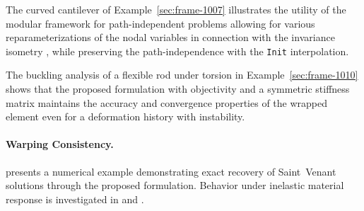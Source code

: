 The curved cantilever of Example~\ref{sec:frame-1007} illustrates the utility of the modular framework for path-independent problems allowing for various reparameterizations of the nodal variables in connection with the invariance isometry \Spherical{}, while preserving the path-independence with the \texttt{Init} interpolation.

The buckling analysis of a flexible rod under torsion in Example~\ref{sec:frame-1010} shows that the proposed formulation with objectivity and a symmetric stiffness matrix maintains the accuracy and 
convergence properties of the wrapped element even for a deformation history with instability.

\paragraph{Warping Consistency.}

 presents a numerical example demonstrating exact recovery of 
Saint~Venant solutions through the proposed formulation. 
Behavior under inelastic material response is investigated in  and .

